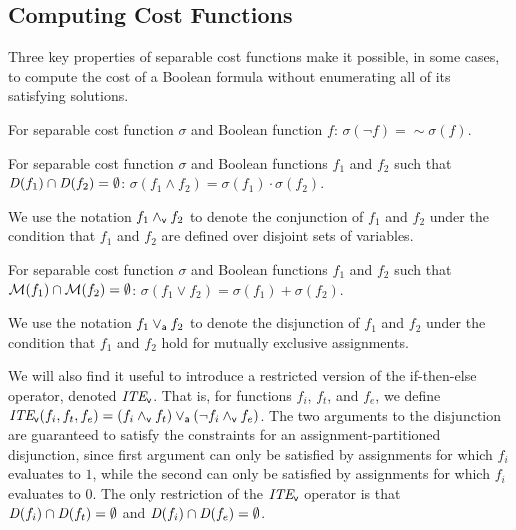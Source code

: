 \documentclass{llncs}
\newcommand{\pand}{\mathbin{\land_{\sf v}}}
\newcommand{\por}{\mathbin{\lor_{\sf a}}}
\newcommand{\tautology}{1}
\newcommand{\nil}{0}
\newcommand{\pite}{\mbox{\it ITE}_{\sf v}}
\newcommand{\oneminus}{{\sim}}
\newcommand{\interpset}[1]{{\cal M}(#1)}
\newcommand{\cost}{\sigma}
\newcommand{\depend}{{\it D}}
\begin{document}
\subsection{Computing Cost Functions}

Three key properties of separable cost functions make it possible, in
some cases, to compute the cost of a Boolean formula without
enumerating all of its satisfying solutions.


\begin{lemma}[Complementation]
\label{lemma:complementation}
  For separable cost function $\cost$ and Boolean function $f$:
  $\cost(\neg f) = \oneminus \cost(f)$.
\end{lemma}

\begin{lemma}
\label{lemma:conjunction}
  For separable cost function $\cost$ and Boolean functions $f_1$ and $f_2$ such that $\depend(f_1) \cap \depend(f_2) = \emptyset$:
    $\cost(f_1 \land f_2) = \cost(f_1) \cdot \cost(f_2)$.
\end{lemma}
We use the notation $f_1 \pand f_2$ to denote the conjunction of $f_1$ and
$f_2$ under the condition that $f_1$ and $f_2$ are defined over
disjoint sets of variables.

\begin{lemma}
\label{lemma:disjunction}
  For separable cost function $\cost$ and Boolean functions $f_1$ and $f_2$ such that $\interpset{f_1} \cap \interpset{f_2} = \emptyset$:
    $\cost(f_1 \lor f_2) = \cost(f_1) + \cost(f_2)$.
\end{lemma}
We use the notation $f_1 \por f_2$ to denote the disjunction of $f_1$ and $f_2$ under the
condition that $f_1$ and $f_2$ hold for mutually exclusive assignments.

We will also find it useful to introduce a restricted version of the
if-then-else operator, denoted $\pite$.  That is, for functions $f_i$,
$f_t$, and $f_e$, we define $\pite(f_i, f_t, f_e) = (f_i \pand f_t)
\por (\neg f_i \pand f_e)$.  The two arguments to the disjunction are
guaranteed to satisfy the constraints for an assignment-partitioned
disjunction, since first argument can only be satisfied by assignments
for which $f_i$ evaluates to $\tautology$, while the second can only
be satisfied by assignments for which $f_i$ evaluates to $\nil$.  The
only restriction of the $\pite$ operator is that
$\depend(f_i) \cap \depend(f_t) = \emptyset$ and
$\depend(f_i) \cap \depend(f_e) = \emptyset$.
\end{document}
